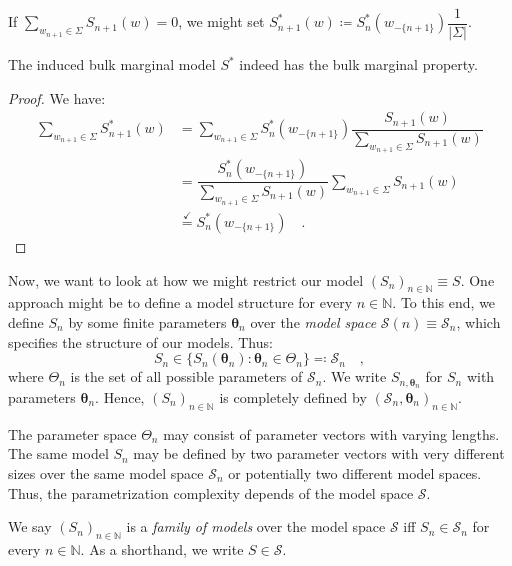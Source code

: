 \documentclass[../../main.tex]{subfiles}
\begin{document}
    \begin{remark}
        If $\sum_{w_{n+1} \in \Sigma} S_{n+1}(w) = 0$, we might set $S_{n + 1}^*(w) \coloneqq S_n^*(w_{-\{n+1\}}) \dfrac{1}{|\Sigma|}$.
    \end{remark}

    \begin{lemma}
        The induced bulk marginal model $S^*$ indeed has the bulk marginal property.
    \end{lemma}
    \vspace{-2.5em}
    \begin{proof}
        We have:
        \begin{align*}
            \sum_{w_{n + 1} \in \Sigma} S_{n + 1}^*(w) &= \sum_{w_{n + 1} \in \Sigma} S_n^*(w_{-\{n+1\}}) \dfrac{S_{n+1}(w)}{\sum_{w_{n+1} \in \Sigma} S_{n+1}(w)} \\
            &= \dfrac{S_n^*(w_{-\{n+1\}})}{\sum_{w_{n+1} \in \Sigma} S_{n+1}(w)} \sum_{w_{n + 1} \in \Sigma} S_{n+1}(w) \\
            &\overset{\checkmark}{=} S_n^*(w_{-\{n+1\}}) \quad .
        \end{align*}
    \end{proof}

\pagebreak
    Now, we want to look at how we might restrict our model $(S_n)_{n \in \mathbb{N}} \equiv S$. One approach might be to define a model structure for every $n \in \mathbb{N}$. To this end, we define $S_n$ by some finite parameters $\bm{\theta}_n$ over the \emph{model space} $\mathcal{S}(n) \equiv \mathcal{S}_n$, which specifies the structure of our models. Thus:
    \[
        S_n \in \{ S_n(\bm{\theta}_n) : \bm{\theta}_n \in \Theta_n \} \eqqcolon \mathcal{S}_n \quad ,
    \]
    where $\Theta_n$ is the set of all possible parameters of $\mathcal{S}_n$. We write $S_{n, \bm{\theta}_n}$ for $S_n$ with parameters $\bm{\theta}_n$. Hence, $(S_n)_{n \in \mathbb{N}}$ is completely defined by $(\mathcal{S}_n, \bm{\theta}_n)_{n \in \mathbb{N}}$.

    \begin{remark}
        The parameter space $\Theta_n$ may consist of parameter vectors with varying lengths. The same model $S_n$ may be defined by two parameter vectors with very different sizes over the same model space $\mathcal{S}_n$ or potentially two different model spaces. Thus, the parametrization complexity depends of the model space $\mathcal{S}$.
    \end{remark}

    \begin{definition}
        We say $(S_n)_{n \in \mathbb{N}}$ is a \emph{family of models} over the model space $\mathcal{S}$ iff $S_n \in \mathcal{S}_n$ for every $n \in \mathbb{N}$. As a shorthand, we write $S \in \mathcal{S}$.
    \end{definition}
\end{document}
